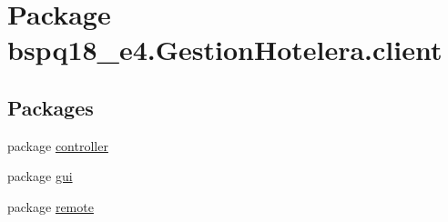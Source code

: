 \hypertarget{namespacebspq18__e4_1_1_gestion_hotelera_1_1client}{}\section{Package bspq18\+\_\+e4.\+Gestion\+Hotelera.\+client}
\label{namespacebspq18__e4_1_1_gestion_hotelera_1_1client}
\subsection*{Packages}
\begin{DoxyCompactItemize}
\item 
package \mbox{\hyperlink{namespacebspq18__e4_1_1_gestion_hotelera_1_1client_1_1controller}{controller}}
\item 
package \mbox{\hyperlink{namespacebspq18__e4_1_1_gestion_hotelera_1_1client_1_1gui}{gui}}
\item 
package \mbox{\hyperlink{namespacebspq18__e4_1_1_gestion_hotelera_1_1client_1_1remote}{remote}}
\end{DoxyCompactItemize}
